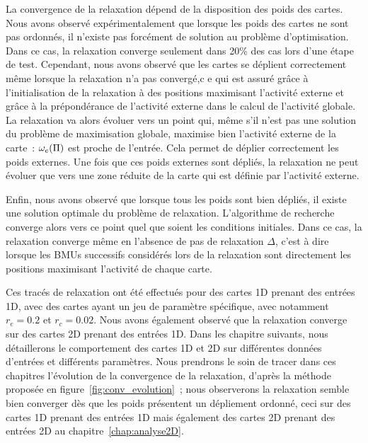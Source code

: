\documentclass[../main]{subfiles}
\begin{document}
La convergence de la relaxation dépend de la disposition des poids des cartes.
Nous avons observé expérimentalement que lorsque les poids des cartes ne sont pas ordonnés, il n'existe pas forcément de solution au problème d'optimisation. Dans ce cas, la relaxation converge seulement dans 20\% des cas lors d'une étape de test.
Cependant, nous avons observé que les cartes se déplient correctement même lorsque la relaxation n'a pas convergé,c e qui est assuré grâce à l'initialisation de la relaxation à des positions maximisant l'activité externe et grâce à la prépondérance de l'activité externe dans le calcul de l'activité globale. 
La relaxation va alors évoluer vers un point qui, même s'il n'est pas une solution du problème de maximisation globale, maximise bien l'activité externe de la carte~: $\omega_e(\Pi)$ est proche de l'entrée. Cela permet de déplier correctement les poids externes. Une fois que ces poids externes sont dépliés, la relaxation ne peut évoluer que vers une zone réduite de la carte qui est définie par l'activité externe.

Enfin, nous avons observé que lorsque tous les poids sont bien dépliés, il existe une solution optimale du problème de relaxation. L'algorithme de recherche converge alors vers ce point quel que soient les conditions initiales.
Dans ce cas, la relaxation converge même en l'absence de pas de relaxation $\Delta$, c'est à dire lorsque les BMUs successifs considérés lors de la relaxation sont directement les positions maximisant l'activité de chaque carte.

Ces tracés de relaxation ont été effectués pour des cartes 1D prenant des entrées 1D, avec des cartes ayant un jeu de paramètre spécifique, avec notamment $r_e = 0.2$ et $r_c = 0.02$. 
Nous avons également observé que la relaxation converge sur des cartes 2D prenant des entrées 1D.
Dans les chapitre suivants, nous détaillerons le comportement des cartes 1D et 2D sur différentes données d'entrées et différents paramètres. Nous prendrons le soin de tracer dans ces chapitres l'évolution de la convergence de la relaxation, d'après la méthode proposée en figure~\ref{fig:conv_evolution}~; nous observerons la relaxation semble bien converger dès que les poids présentent un dépliement ordonné, ceci sur des cartes 1D prenant des entrées 1D mais également des cartes 2D prenant des entrées 2D au chapitre~\ref{chap:analyse2D}.

\ifSubfilesClassLoaded{
    \printbibliography
}{}
\end{document}
